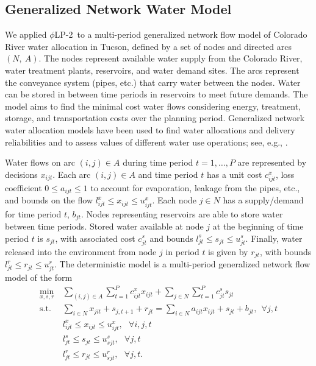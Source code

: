 \documentclass[opre,nonblindrev]{informs3} %
\newcommand{\st}{\mbox{s.t.}}
\newcommand{\plp}{$\phi$LP-2}
\begin{document}
\subsection{Generalized Network Water Model} 
\label{ssec:network_model}

We applied \plp\ to a multi-period generalized network flow model of Colorado River water allocation in Tucson, defined by a set of nodes and directed arcs $(N,\: A)$.
The nodes represent available water supply from the Colorado River, water treatment plants, reservoirs, and water demand sites.
The arcs represent the conveyance system (pipes, etc.) that carry water between the nodes.
Water can be stored in between time periods in reservoirs to meet future demands.
The model aims to find the minimal cost water flows considering energy, treatment, storage, and transportation costs over the planning period. 
Generalized network water allocation models have been used to find water allocations and delivery reliabilities and to assess values of different water use operations; see, e.g., \cite{draper_etal_03}. 

Water flows on arc $(i,j) \in A$ during time period $t = 1, \dots, P$ are represented by decisions $x_{ijt}$.
Each arc $(i,j) \in A$ and time period $t$ has a unit cost $c_{ijt}^x$, loss coefficient $0 \leq a_{ijt} \leq 1$ to account for evaporation, leakage from the pipes, etc., and bounds on the flow $l_{ijt}^x \leq x_{ijt} \leq u_{ijt}^x$.
Each node $j \in N$ has a supply/demand for time period $t$, $b_{jt}$.
Nodes representing reservoirs are able to store water between time periods.
Stored water available at node $j$ at the beginning of time period $t$ is $s_{jt}$, with associated cost $c_{jt}^s$ and bounds $l_{jt}^s \leq s_{jt} \leq u_{jt}^s$.
Finally, water released into the environment from node $j$ in period $t$ is given by $r_{jt}$, with bounds $l_{jt}^r \leq r_{jt} \leq u_{jt}^r$.
The deterministic model is a multi-period generalized network flow model of the form
\begin{align*}
	\min_{x,s,r} \ & \sum_{(i,j) \in A} \sum_{t=1}^P c_{ijt}^x x_{ijt} + \sum_{j \in N} \sum_{t=1}^P c_{jt}^s s_{jt}\\
	\st \ & \sum_{i \in N} x_{jit} + s_{j,t+1} + r_{jt} = \sum_{i \in N} a_{ijt} x_{ijt} + s_{jt} + b_{jt}, \ \ \forall j,t \\
	& l_{ijt}^x \leq x_{ijt} \leq u_{ijt}^x,\ \ \ \forall i,j,t \\
	& l_{jt}^s \leq s_{jt} \leq u_{sjt}^s, \ \ \ \forall j,t \\
	& l_{jt}^r \leq r_{jt} \leq u_{sjt}^r, \ \ \ \forall j,t.
\end{align*}
\end{document}
